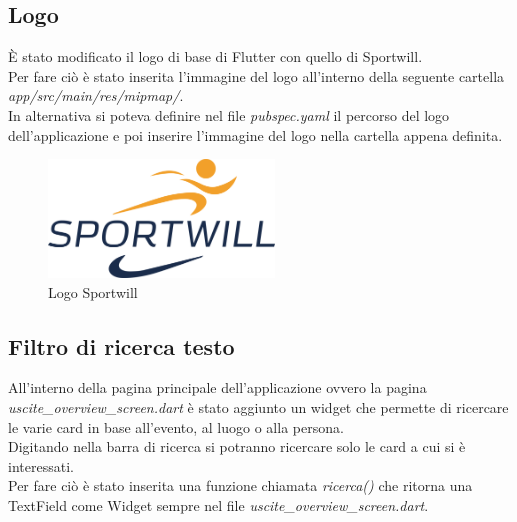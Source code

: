 \subsection{Logo}
È stato modificato il logo di base di Flutter con quello di Sportwill.\\
Per  fare ciò è stato inserita l'immagine del logo all'interno della seguente cartella \textit{app/src/main/res/mipmap/}.\\
In alternativa si poteva definire nel file \textit{pubspec.yaml} il percorso del logo dell'applicazione e poi inserire l'immagine del logo nella cartella appena definita.\\

\begin{figure}[htbp]	
	\centering
	\includegraphics[width=6cm]{immagini/logosportwill.png}
	\caption{Logo Sportwill}
	\label{fig:Logo Sportwill}
\end{figure}

\newpage

\subsection{Filtro di ricerca testo}
All'interno della pagina principale dell'applicazione ovvero la pagina \textit{uscite\_overview\_screen.dart} è stato aggiunto un widget che permette di ricercare le varie card in base all'evento, al luogo o alla persona.\\
Digitando nella barra di ricerca si potranno ricercare solo le card a cui si è interessati.\\
Per fare ciò è stato inserita una funzione chiamata \textit{ricerca()} che ritorna una TextField come Widget sempre nel file \textit{uscite\_overview\_screen.dart}.\\

